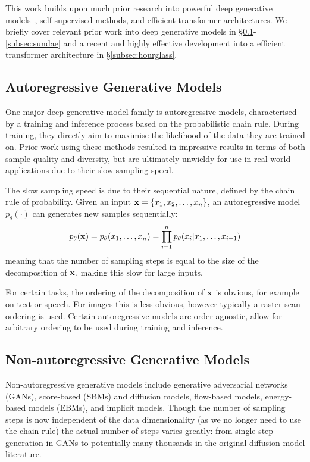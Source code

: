 This work builds upon much prior research into powerful deep generative
models~\cite{bondtaylor2021review}, self-supervised methods, and efficient
transformer architectures. We briefly cover relevant prior work into deep
generative models in \S\ref{subsec:agm}-\ref{subsec:sundae} and a recent and
highly effective development into a efficient transformer architecture in
\S\ref{subsec:hourglass}.

\subsection{Autoregressive Generative Models}
\label{subsec:agm}
One major deep generative model family is autoregressive models, characterised
by a training and inference process based on the probabilistic chain rule.
During training, they directly aim to maximise the likelihood of the data they
are trained on. Prior work using these methods resulted in impressive results in
terms of both sample quality and diversity, but are ultimately unwieldy for use
in real world applications due to their slow sampling speed.

The slow sampling speed is due to their sequential nature, defined by the chain
rule of probability. Given an input $\mathbf{x} = \{ x_{1}, x_{2}, \dots,
x_{n} \}$, an autoregressive model $p_\theta(\cdot)$ can generates new
samples sequentially:
\begin{equation}\label{eq:ar}
    p_\theta(\mathbf{x}) = p_\theta(x_{1}, \dots, x_{n}) =
    \prod\limits^{n}_{i=1} p_\theta(x_{i} \vert x_{1}, \dots, x_{i-1})
\end{equation}
meaning that the number of sampling steps is equal to the size of the
decomposition of $\mathbf{x}$, making this slow for large inputs.

For certain tasks, the ordering of the decomposition of $\mathbf{x}$ is obvious, for
example on text or speech. For images this is less obvious, however typically a
raster scan ordering is used. Certain autoregressive models are order-agnostic,
allow for arbitrary ordering to be used during training and inference.

\subsection{Non-autoregressive Generative Models}
\label{subsec:nagm}
Non-autoregressive generative models include generative adversarial networks
(GANs), score-based (SBMs) and diffusion models, flow-based models, energy-based
models (EBMs), and implicit models. Though the number of sampling steps is now
independent of the data dimensionality (as we no longer need to use the chain
rule) the actual number of steps varies greatly: from single-step generation in
GANs to potentially many thousands in the original diffusion model literature.

